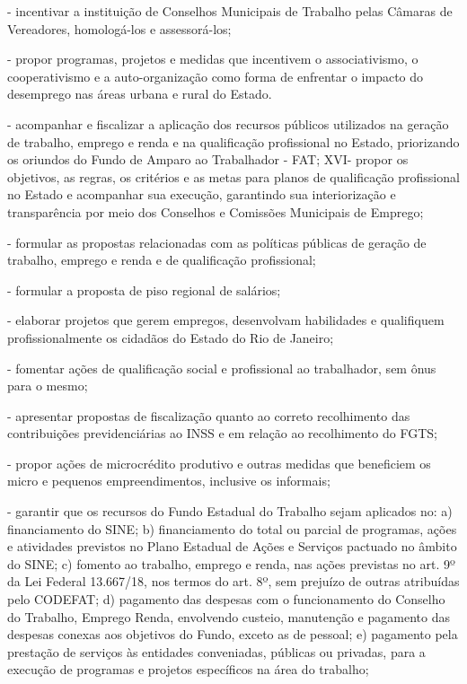 \documentclass[10pt]{article}
\begin{document}
\item - incentivar a instituição de Conselhos Municipais de Trabalho pelas Câmaras de Vereadores, homologá-los e assessorá-los;
\item - propor programas, projetos e medidas que incentivem o associativismo, o cooperativismo e a auto-organização como forma de enfrentar o impacto do desemprego nas áreas urbana e rural do Estado.
\item - acompanhar e fiscalizar a aplicação dos recursos públicos utilizados na geração de trabalho, emprego e renda e na qualificação profissional no Estado, priorizando os oriundos do Fundo de Amparo ao Trabalhador - FAT;
 XVI- propor os objetivos, as regras, os critérios e as metas para planos de qualificação profissional no Estado e acompanhar sua execução, garantindo sua interiorização e transparência por meio dos Conselhos e Comissões Municipais de Emprego;
\item - formular as propostas relacionadas com as políticas públicas de geração de trabalho, emprego e renda e de qualificação profissional;
\item - formular a proposta de piso regional de salários;
\item - elaborar projetos que gerem empregos, desenvolvam habilidades e qualifiquem profissionalmente os cidadãos do Estado do Rio de Janeiro;
\item - fomentar ações de qualificação social e profissional ao trabalhador, sem ônus para o mesmo;
\item - apresentar propostas de fiscalização quanto ao correto recolhimento das contribuições previdenciárias ao INSS e em relação ao recolhimento do FGTS;
\item - propor ações de microcrédito produtivo e outras medidas que beneficiem os micro e pequenos empreendimentos, inclusive os informais;
\item - garantir que os recursos do Fundo Estadual do Trabalho sejam aplicados no: 
a)	financiamento do SINE;
b)	financiamento do total ou parcial de programas, ações e atividades previstos no Plano Estadual de Ações e Serviços pactuado no âmbito do SINE;
c)	fomento ao trabalho, emprego e renda, nas ações previstas no art. 9º da Lei Federal 13.667/18, nos termos do art. 8º, sem prejuízo de outras atribuídas pelo CODEFAT;
d)	pagamento das despesas com o funcionamento do Conselho do Trabalho, Emprego Renda, envolvendo custeio, manutenção e pagamento das despesas conexas aos objetivos do Fundo, exceto as de pessoal;
e)	pagamento pela prestação de serviços às entidades conveniadas, públicas ou privadas, para a execução de programas e projetos específicos na área do trabalho;
\end{document}
